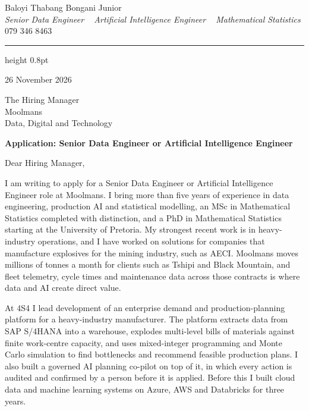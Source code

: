 \documentclass[a4paper,11pt]{article}
\begin{document}
\begin{center}
    {\huge Baloyi Thabang Bongani Junior} \\ \vspace{2pt}
    {\large\textit{Senior Data Engineer \textbar~ Artificial Intelligence Engineer \textbar~ Mathematical Statistics}} \\ \vspace{4pt}
    {079 346 8463} ~\textbar~
    \href{mailto:Baloyibongani1@gmail.com}{\color{blue}{Baloyibongani1@gmail.com}} ~\textbar~
    \href{https://www.linkedin.com/in/thabang-bongani-junior-baloyi-2622b0286/}{\color{blue}{LinkedIn}} ~\textbar~
    \href{https://github.com/thabangTheActuaryCoder}{\color{blue}{GitHub}}
\end{center}
{\color{airforceblue}\hrule height 0.8pt}

\vspace{6pt}
26 November 2026

The Hiring Manager \\
Moolmans \\
Data, Digital and Technology

\textbf{Application: Senior Data Engineer or Artificial Intelligence Engineer}

Dear Hiring Manager,

I am writing to apply for a Senior Data Engineer or Artificial Intelligence Engineer role at
Moolmans. I bring more than five years of experience in data engineering, production AI and
statistical modelling, an MSc in Mathematical Statistics completed with distinction, and a PhD in
Mathematical Statistics starting at the University of Pretoria. My strongest recent work is in
heavy-industry operations, and I have worked on solutions for companies that manufacture explosives
for the mining industry, such as AECI. Moolmans moves millions of tonnes a month for clients such as Tshipi and Black Mountain, and fleet telemetry, cycle times and maintenance data across those contracts is where data and AI create direct value.

At 4S4 I lead development of an enterprise demand and production-planning platform for a
heavy-industry manufacturer. The platform extracts data from SAP S/4HANA into a warehouse, explodes multi-level
bills of materials against finite work-centre capacity, and uses mixed-integer programming
and Monte Carlo simulation to find bottlenecks and recommend feasible production plans. I also built a governed AI planning co-pilot on top
of it, in which every action is audited and confirmed by a person before it is applied. Before this I
built cloud data and machine learning systems on Azure, AWS and Databricks for three years.
\end{document}
